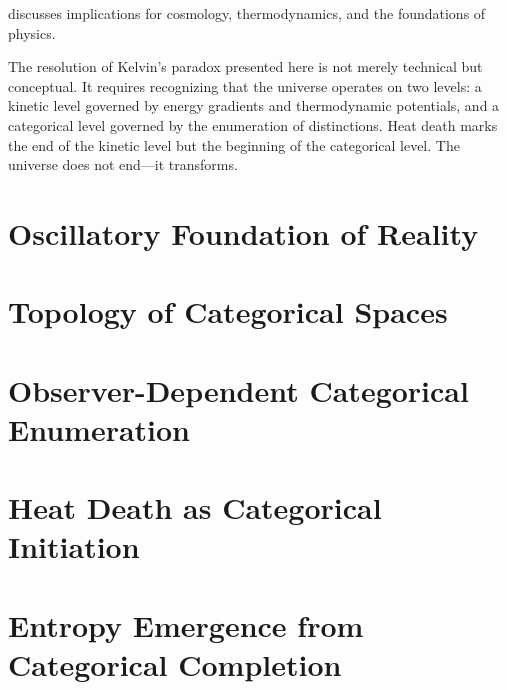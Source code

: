 discusses implications for cosmology, thermodynamics, and the foundations of physics.

The resolution of Kelvin's paradox presented here is not merely technical but conceptual. It requires recognizing that the universe operates on two levels: a kinetic level governed by energy gradients and thermodynamic potentials, and a categorical level governed by the enumeration of distinctions. Heat death marks the end of the kinetic level but the beginning of the categorical level. The universe does not end—it transforms.


\section{Oscillatory Foundation of Reality}
\label{sec:oscillatory}


\section{Topology of Categorical Spaces}
\label{sec:topology}


\section{Observer-Dependent Categorical Enumeration}
\label{sec:observer}


\section{Heat Death as Categorical Initiation}
\label{sec:heat_death}


\section{Entropy Emergence from Categorical Completion}
\label{sec:entropy}


